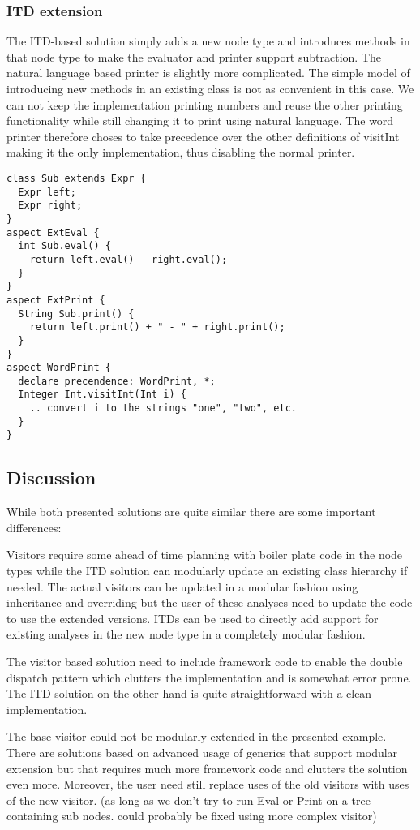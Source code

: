 \subsubsection{ITD extension}
The ITD-based solution simply adds a new node type and introduces methods in that
node type to make the evaluator and printer support subtraction.
The natural language based printer is slightly more complicated. The simple
model of introducing new methods in an existing class is not as convenient
in this case. We can not keep the implementation printing numbers and reuse
the other printing functionality while still changing it to print using
natural language. The word printer therefore choses to take precedence over
the other definitions of visitInt making it the only implementation, thus
disabling the normal printer.

\begin{lstlisting}[caption={ITD Extension}]
class Sub extends Expr {
  Expr left;
  Expr right;
}
aspect ExtEval {
  int Sub.eval() {
    return left.eval() - right.eval();
  }
}
aspect ExtPrint {
  String Sub.print() {
    return left.print() + " - " + right.print(); 
  }
}
aspect WordPrint {
  declare precendence: WordPrint, *;
  Integer Int.visitInt(Int i) {
    .. convert i to the strings "one", "two", etc.
  }
}
\end{lstlisting}

\subsection{Discussion}
While both presented solutions are quite similar there are some important
differences:

Visitors require some ahead of time planning with boiler plate code in the 
node types while the ITD solution can modularly update an existing class 
hierarchy if needed. The actual visitors can be updated in a 
modular fashion using inheritance and overriding but the user of these 
analyses need to update the code to use the extended versions. ITDs can 
be used to directly add support for existing analyses in the new node type 
in a completely modular fashion. 

The visitor based solution need to include framework code to enable the 
double dispatch pattern which clutters the implementation and is somewhat 
error prone. The ITD solution on the other hand is quite 
straightforward with a clean implementation.

The base visitor could not be modularly extended in the presented example.
There are solutions based on advanced usage of generics that support
modular extension but that requires much more framework code and clutters
the solution even more. Moreover, the user need still replace uses of the
old visitors with uses of the new visitor.
(as long as we don't try to run Eval
or Print on a tree containing sub nodes. could probably be fixed using more
complex visitor)


